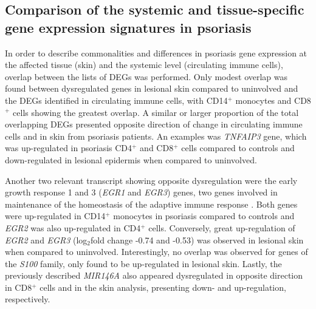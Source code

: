 



\subsection{Comparison of the systemic and tissue-specific gene expression signatures in psoriasis}

In order to describe commonalities and differences in psoriasis gene expression at the affected tissue (skin) and the systemic level (circulating immune cells), overlap between the lists of DEGs was performed. Only modest overlap was found between dysregulated genes in lesional skin compared to uninvolved and the DEGs identified in circulating immune cells, with CD14$^+$ monocytes and CD8$^+$ cells showing the greatest overlap. A similar or larger proportion of the total overlapping DEGs presented opposite direction of change in circulating immune cells and in skin from psoriasis patients. An examples was \textit{TNFAIP3} gene, which was up-regulated in psoriasis CD4$^+$ and CD8$^+$ cells compared to controls and down-regulated in lesional epidermis when compared to uninvolved.  

Another two relevant transcript showing opposite dysregulation were the early growth response 1 and 3 (\textit{EGR1} and \textit{EGR3}) genes, two genes involved in maintenance of the homeostasis of the adaptive immune response \parencite{Li2012}. Both genes were up-regulated in CD14$^+$ monocytes in psoriasis compared to controls and \textit{EGR2} was also up-regulated in CD4$^+$ cells. Conversely, great up-regulation of \textit{EGR2} and \textit{EGR3} (log$_{2}$fold change -0.74 and -0.53) was observed in 
lesional skin when compared to uninvolved. Interestingly, no overlap was observed for genes of the \textit{S100} family, only found to be up-regulated in lesional skin. Lastly, the previously described \textit{MIR146A} also appeared dysregulated in opposite direction in CD8$^+$ cells and in the skin analysis, presenting down- and up-regulation, respectively.

